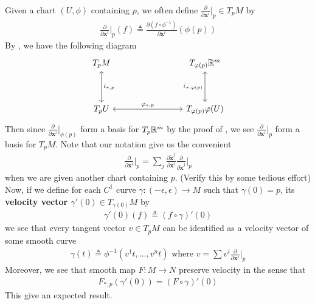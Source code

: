 \documentclass{report}
\begin{document}
\begin{mdframed}
Given a chart $(U,\phi)$ containing $p$, we often define $\frac{\partial }{\partial \textbf{x}^i}|_p\in T_pM$ by
\begin{align}
\label{tsbasis}
\frac{\partial }{\partial \textbf{x}^i}\Big|_p (f) \triangleq \frac{\partial (f\circ \phi^{-1})}{\partial \textbf{x}^i}(\phi (p))
\end{align}
By , we have the following diagram 
\[\begin{tikzcd}
	{T_pM} &&& {T_{\varphi (p)}\R^m} \\
	\\
	{T_pU} & {} && {T_{\varphi(p)}\varphi(U)}
	\arrow["{\dot{\iota}_{*,\varphi(p)}}"', leftrightarrow, from=1-4, to=3-4]
	\arrow["{\dot{\iota}_{*,p}}"', leftrightarrow, from=3-1, to=1-1]
	\arrow["{\varphi_{*,p}}", leftrightarrow, from=3-1, to=3-4]
\end{tikzcd}\]
Then since $\frac{\partial}{\partial \textbf{x}^i}|_{\phi (p)}$ form a basis for $T_p\mathbb{R}^m$ by the proof of  , we see $\frac{\partial }{\partial \textbf{x}^i}|_p$ form a basis for $T_pM$. Note that our notation give us the convenient 
\begin{align*}
\frac{\partial }{\partial \textbf{x}^i}\Big|_p= \sum_j \frac{\partial \tilde{\textbf{x}}^j }{\partial \textbf{x}^i} \frac{\partial  }{\partial \tilde{\textbf{x}}^j }\Big|_p
\end{align*}
when we are given another chart containing $p$.  (Verify this by some tedious effort) \\






Now, if we define for each $C^1$ curve $\gamma:(-\epsilon , \epsilon )\rightarrow M$ such that $\gamma  (0)=p$, its \textbf{velocity vector $\gamma '(0) \in T_{\gamma (0)}M$} by 
\begin{align*}
\gamma '(0)(f)\triangleq (f\circ \gamma )'(0)
\end{align*}
we see that every tangent vector $v \in T_p M$ can be identified as a velocity vector of some smooth curve 
\begin{align*}
\gamma (t)\triangleq \phi^{-1}(v^1t,\dots ,v^nt)\text{ where }v= \sum v^i \frac{\partial }{\partial \textbf{x}^i}\Big|_p
\end{align*}
Moreover, we see that smooth map $F:M\rightarrow N$ preserve velocity in the sense that 
\begin{align*}
F_{*,p}(\gamma '(0))= (F\circ \gamma )'(0)
\end{align*}
This give an expected result. 
\end{mdframed}
\end{document}
